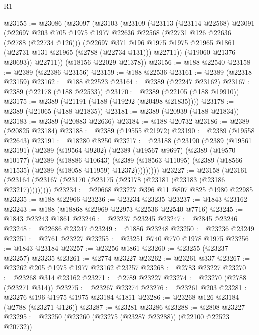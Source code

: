 \begin{lexlean}{R1}
\begin{coremodule}
@23155 := @23086
    (@23097
      (@23103
        (@23109
          (@23113
            (@23114 @22568)
            @23091
            (@22697
              @203
              @705
              @1975
              @1977
              @22636
              @22568
              (@22731 @126 @22636 (@2788 (@22734 @126)))
              (@22697
                @371
                @196
                @1975
                @1975
                @21965
                @1861
                (@22731 @131 @21965 (@2788 (@22734 @131)))
                @22711))
            (@19060 @21376 @20693))
          @22711))
      (@18156 @22029 @21378))
@23156 := @188 @22540
@23158 := @2389 (@22386 @23156)
@23159 := @188 @22536
@23161 := @2389 (@22318 @23159)
@23162 := @188 @22523
@23164 := @2389 (@22247 @23162)
@23167 := @2389 (@22178 (@188 @22533))
@23170 := @2389 (@22105 (@188 @19910))
@23175 := @2389 (@21191 (@188 (@19292 (@20498 @21835))))
@23178 := @2389 (@21065 (@188 @21835))
@23181 := @2389 (@20939 (@188 @21834))
@23183 := @2389 (@20883 @22636)
@23184 := @188 @20732
@23186 := @2389 (@20825 @23184)
@23188 := @2389 (@19555 @21972)
@23190 := @2389 (@19558 @22643)
@23191 := @18280 @8250
@23217 := @23188
    (@23190
      (@2389
        (@19561 @23191)
        (@2389
          (@19564 @9202)
          (@2389
            (@19567 @9697)
            (@2389
              (@19570 @10177)
              (@2389
                (@18886 @10643)
                (@2389 (@18563 @11095) (@2389 (@18566 @11535) (@2389 (@18058 @11959) @12372)))))))))
@23227 := @23158
    (@23161 (@23164 (@23167 (@23170 (@23175 (@23178 (@23181 (@23183 (@23186 @23217)))))))))
@23234 := @20668 @23227 @396 @11 @807 @825 @1980 @22985
@23235 := @188 @22966
@23236 := @23234 @23235
@23237 := @1843 @23162
@23243 := @188 (@18868 @22969 @22973 @22536 @22540 @7716)
@23245 := @1843 @23243 @1861
@23246 := @23237 @23245
@23247 := @2845 @23246
@23248 := @22686 @23247
@23249 := @1886 @23248
@23250 := @23236 @23249
@23251 := @2761 @23227
@23255 := @23251 @740 @770 @1978 @1975
@23256 := @1843 @23184
@23257 := @23256 @1861
@23260 := @23255 (@23237 @23257) @23235
@23261 := @2774 @23227
@23262 := @23261 @337
@23267 := @23262 @205 @1975 @1977 @23162 @23257
@23268 := @2783 @23227
@23270 := @23268 @314 @23162
@23271 := @2789 @23227
@23274 := @23270 (@2788 (@23271 @314))
@23275 := @23267 @23274
@23276 := @23261 @203
@23281 := @23276 @196 @1975 @1975 @23184 @1861
@23286 := @23268 @126 @23184 (@2788 (@23271 @126))
@23287 := @23281 @23286
@23288 := @2808 @23227
@23295 := @23250 (@23260 (@23275 (@23287 @23288)) (@22100 @22523 @20732))

\end{coremodule}
\end{lexlean}
